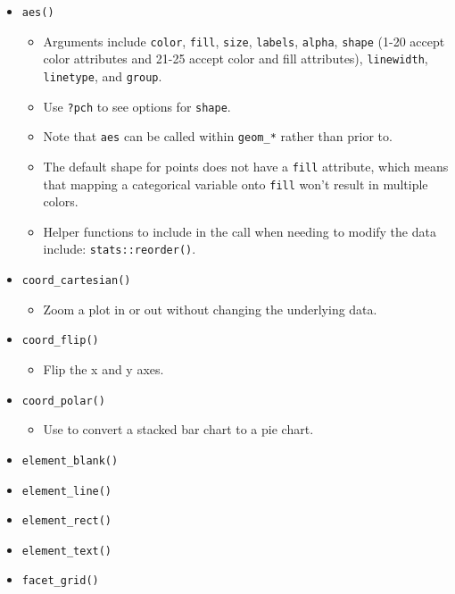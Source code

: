\documentclass[
]{book}
\providecommand{\tightlist}{%
  \setlength{\itemsep}{0pt}\setlength{\parskip}{0pt}}
\begin{document}
\begin{itemize}
\tightlist
\item
  \texttt{aes()}

  \begin{itemize}
  \tightlist
  \item
    Arguments include \texttt{color}, \texttt{fill}, \texttt{size}, \texttt{labels}, \texttt{alpha}, \texttt{shape} (1-20 accept color attributes and 21-25 accept color and fill attributes), \texttt{linewidth}, \texttt{linetype}, and \texttt{group}.
  \item
    Use \texttt{?pch} to see options for \texttt{shape}.
  \item
    Note that \texttt{aes} can be called within \texttt{geom\_*} rather than prior to.
  \item
    The default shape for points does not have a \texttt{fill} attribute, which means that mapping a categorical variable onto \texttt{fill} won't result in multiple colors.
  \item
    Helper functions to include in the call when needing to modify the data include: \texttt{stats::reorder()}.
  \end{itemize}
\item
  \texttt{coord\_cartesian()}

  \begin{itemize}
  \tightlist
  \item
    Zoom a plot in or out without changing the underlying data.
  \end{itemize}
\item
  \texttt{coord\_flip()}

  \begin{itemize}
  \tightlist
  \item
    Flip the x and y axes.
  \end{itemize}
\item
  \texttt{coord\_polar()}

  \begin{itemize}
  \tightlist
  \item
    Use to convert a stacked bar chart to a pie chart.
  \end{itemize}
\item
  \texttt{element\_blank()}
\item
  \texttt{element\_line()}
\item
  \texttt{element\_rect()}
\item
  \texttt{element\_text()}
\item
  \texttt{facet\_grid()}


\end{itemize}
\end{document}
